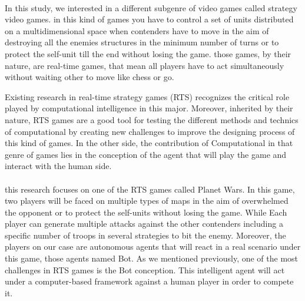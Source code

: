 \documentclass[]{interact}
\theoremstyle{plain}%
\theoremstyle{definition}
\theoremstyle{remark}
\begin{document}
\paragraph*{} 
In this study, we interested in a different subgenre of video games called strategy video games. in this kind of games you have to control a set of units distributed on a multidimensional space when contenders have to move in the aim of destroying all the enemies structures in the minimum number of turns or to protect the self-unit till the end without losing the game. those games, by their nature, are real-time games, that mean all players have to act simultaneously without waiting other to move\cite{doc3} like chess or go. \par 
Existing research in real-time strategy games (RTS) recognizes the critical role played by computational intelligence in this major. Moreover, inherited by their nature, RTS games are a good tool for testing the different methods and technics of computational by creating new challenges to improve the designing process of this kind of games. In the other side, the contribution of Computational in that genre of games lies in the conception of the agent that will play the game and interact with the human side.\cite{doc5,doc1,doc2,doc3,doc4}

\paragraph*{}
this research focuses on one of the RTS games called Planet Wars. In this game, two players will be faced on multiple types of maps in the aim of overwhelmed the opponent or to protect the self-units without losing the game. While Each player can generate multiple attacks against the other contenders including a specific number of troops in several strategies to bit the enemy. Moreover, the players on our case are autonomous agents that will react in a real scenario under this game, those agents named Bot. As we mentioned previously, one of the most challenges in RTS games is the Bot conception. This intelligent agent will act under a computer-based framework\cite{doc3} against a human player in order to compete it.
\end{document}

